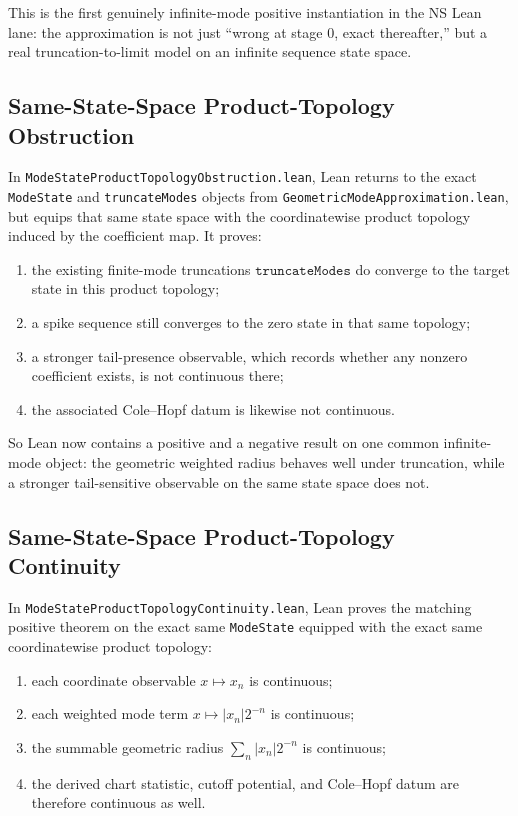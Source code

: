 \documentclass[11pt]{article}
\begin{document}
This is the first genuinely infinite-mode positive instantiation in the NS Lean
lane: the approximation is not just ``wrong at stage \(0\), exact thereafter,''
but a real truncation-to-limit model on an infinite sequence state space.

\subsection{Same-State-Space Product-Topology Obstruction}

In \texttt{ModeStateProductTopologyObstruction.lean}, Lean returns to the exact
\texttt{ModeState} and \texttt{truncateModes} objects from
\texttt{GeometricModeApproximation.lean}, but equips that same state space with
the coordinatewise product topology induced by the coefficient map.  It proves:
\begin{enumerate}[leftmargin=1.5em]
  \item the existing finite-mode truncations \(\texttt{truncateModes}\) do
  converge to the target state in this product topology;
  \item a spike sequence still converges to the zero state in that same
  topology;
  \item a stronger tail-presence observable, which records whether any
  nonzero coefficient exists, is not continuous there;
  \item the associated Cole--Hopf datum is likewise not continuous.
\end{enumerate}

So Lean now contains a positive and a negative result on one common
infinite-mode object: the geometric weighted radius behaves well under
truncation, while a stronger tail-sensitive observable on the same state space
does not.

\subsection{Same-State-Space Product-Topology Continuity}

In \texttt{ModeStateProductTopologyContinuity.lean}, Lean proves the matching
positive theorem on the exact same \texttt{ModeState} equipped with the exact
same coordinatewise product topology:
\begin{enumerate}[leftmargin=1.5em]
  \item each coordinate observable \(x \mapsto x_n\) is continuous;
  \item each weighted mode term \(x \mapsto |x_n| 2^{-n}\) is continuous;
  \item the summable geometric radius \(\sum_n |x_n| 2^{-n}\) is continuous;
  \item the derived chart statistic, cutoff potential, and Cole--Hopf datum are
  therefore continuous as well.
\end{enumerate}
\end{document}

